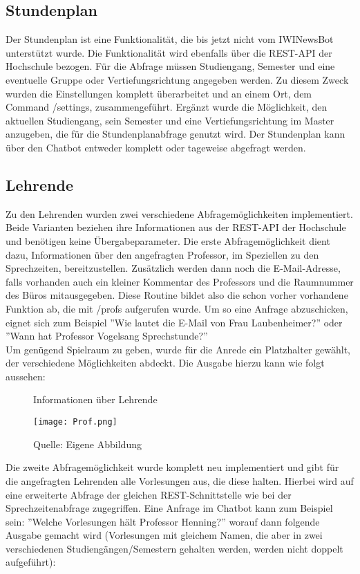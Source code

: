 \subsection{Stundenplan}
Der Stundenplan ist eine Funktionalität, die bis jetzt nicht vom IWINewsBot unterstützt wurde. Die Funktionalität wird ebenfalls über die REST-API der Hochschule bezogen. Für die Abfrage müssen Studiengang, Semester und eine eventuelle Gruppe oder Vertiefungsrichtung angegeben werden. Zu diesem Zweck wurden die Einstellungen komplett überarbeitet und an einem Ort, dem Command /settings, zusammengeführt. Ergänzt wurde die Möglichkeit, den aktuellen Studiengang, sein Semester und eine Vertiefungsrichtung im Master anzugeben, die für die Stundenplanabfrage genutzt wird.
Der Stundenplan kann über den Chatbot entweder komplett oder tageweise abgefragt werden.

\subsection{Lehrende}
Zu den Lehrenden wurden zwei verschiedene Abfragemöglichkeiten implementiert. Beide Varianten beziehen ihre Informationen aus der REST-API der Hochschule und benötigen keine Übergabeparameter. 
Die erste Abfragemöglichkeit dient dazu, Informationen über den angefragten Professor, im Speziellen zu den Sprechzeiten, bereitzustellen. Zusätzlich werden dann noch die E-Mail-Adresse, falls vorhanden auch ein kleiner Kommentar des Professors und die Raumnummer des Büros mitausgegeben. Diese Routine bildet also die schon vorher vorhandene Funktion ab, die mit /profs aufgerufen wurde. Um so eine Anfrage abzuschicken, eignet sich zum Beispiel ''Wie lautet die E-Mail von Frau Laubenheimer?'' oder ''Wann hat Professor Vogelsang Sprechstunde?'' \\
Um genügend Spielraum zu geben, wurde für die Anrede ein Platzhalter gewählt, der verschiedene Möglichkeiten abdeckt. Die Ausgabe hierzu kann wie folgt aussehen:

\begin{figure}[!htb]
    \centering
    \caption{Informationen über Lehrende}
      \texttt{[image: Prof.png]}
      \label{img:profuebersicht}
    \caption*{Quelle: Eigene Abbildung}
\end{figure}

Die zweite Abfragemöglichkeit wurde komplett neu implementiert und gibt für die angefragten Lehrenden alle Vorlesungen aus, die diese halten. Hierbei wird auf eine erweiterte Abfrage der gleichen REST-Schnittstelle wie bei der Sprechzeitenabfrage zugegriffen. Eine Anfrage im Chatbot kann zum Beispiel sein: ''Welche Vorlesungen hält Professor Henning?'' worauf dann folgende Ausgabe gemacht wird (Vorlesungen mit gleichem Namen, die aber in zwei verschiedenen Studiengängen/Semestern gehalten werden, werden nicht doppelt aufgeführt):

